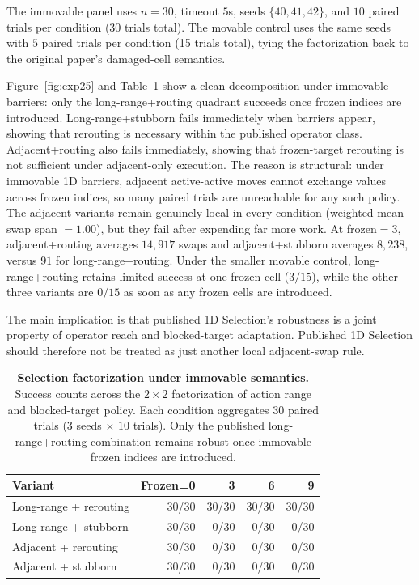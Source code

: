 \documentclass[11pt]{article}
\begin{document}
The immovable panel uses $n=30$, timeout $5$s, seeds $\{40,41,42\}$, and $10$ paired trials per
condition (30 trials total). The movable control uses the same seeds with $5$ paired trials per
condition (15 trials total), tying the factorization back to the original paper's damaged-cell
semantics.

Figure~\ref{fig:exp25} and Table~\ref{tab:exp25} show a clean decomposition under immovable
barriers: only the
long-range+routing quadrant succeeds once frozen indices are introduced. Long-range+stubborn fails
immediately when barriers appear, showing that rerouting is necessary within the published operator
class. Adjacent+routing also fails immediately, showing that frozen-target rerouting is not
sufficient under adjacent-only execution. The reason is structural:
under immovable 1D barriers, adjacent active-active moves cannot exchange values across frozen
indices, so many paired trials are unreachable for any such policy. The adjacent variants remain
genuinely local in every condition (weighted mean swap span $= 1.00$), but they fail after
expending far more work. At frozen$=3$, adjacent+routing averages $14{,}917$ swaps and
adjacent+stubborn averages $8{,}238$, versus $91$ for long-range+routing. Under the smaller movable
control, long-range+routing retains limited success at one frozen cell ($3/15$), while the other
three variants are $0/15$ as soon as any frozen cells are introduced.

The main implication is that published 1D Selection's robustness is a joint property of operator
reach and blocked-target adaptation. Published 1D Selection should therefore not be treated as just
another local adjacent-swap rule.

\begin{table}[t]
  \centering
  \small
  \begin{tabular}{@{}lrrrr@{}}
    \toprule
    Variant & Frozen=0 & 3 & 6 & 9 \\
    \midrule
    Long-range + rerouting & 30/30 & 30/30 & 30/30 & 30/30 \\
    Long-range + stubborn & 30/30 & 0/30 & 0/30 & 0/30 \\
    Adjacent + rerouting & 30/30 & 0/30 & 0/30 & 0/30 \\
    Adjacent + stubborn & 30/30 & 0/30 & 0/30 & 0/30 \\
    \bottomrule
  \end{tabular}
  \caption{\textbf{Selection factorization under immovable semantics.}
  Success counts across the $2\times2$ factorization of action range and blocked-target policy.
  Each condition aggregates $30$ paired trials ($3$ seeds $\times$ $10$ trials). Only the
  published long-range+routing combination remains robust once immovable frozen indices are
  introduced.}
  \label{tab:exp25}
\end{table}
\end{document}
